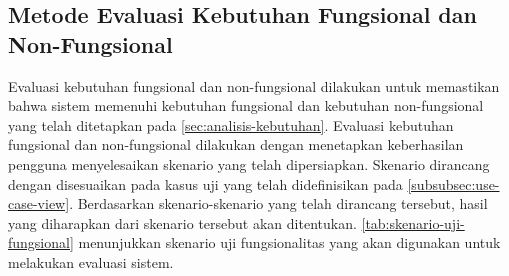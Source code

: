 \subsection{Metode Evaluasi Kebutuhan Fungsional dan Non-Fungsional}
\label{subsec:evaluasi-kebutuhan-fungsional-dan-non-fungsional}
Evaluasi kebutuhan fungsional dan non-fungsional dilakukan untuk memastikan bahwa sistem memenuhi kebutuhan fungsional dan kebutuhan non-fungsional yang telah ditetapkan pada \autoref{sec:analisis-kebutuhan}. Evaluasi kebutuhan fungsional dan non-fungsional dilakukan dengan menetapkan keberhasilan pengguna menyelesaikan skenario yang telah dipersiapkan. Skenario dirancang dengan disesuaikan pada kasus uji yang telah didefinisikan pada \autoref{subsubsec:use-case-view}. Berdasarkan skenario-skenario yang telah dirancang tersebut, hasil yang diharapkan dari skenario tersebut akan ditentukan. \autoref{tab:skenario-uji-fungsional} menunjukkan skenario uji fungsionalitas yang akan digunakan untuk melakukan evaluasi sistem.
